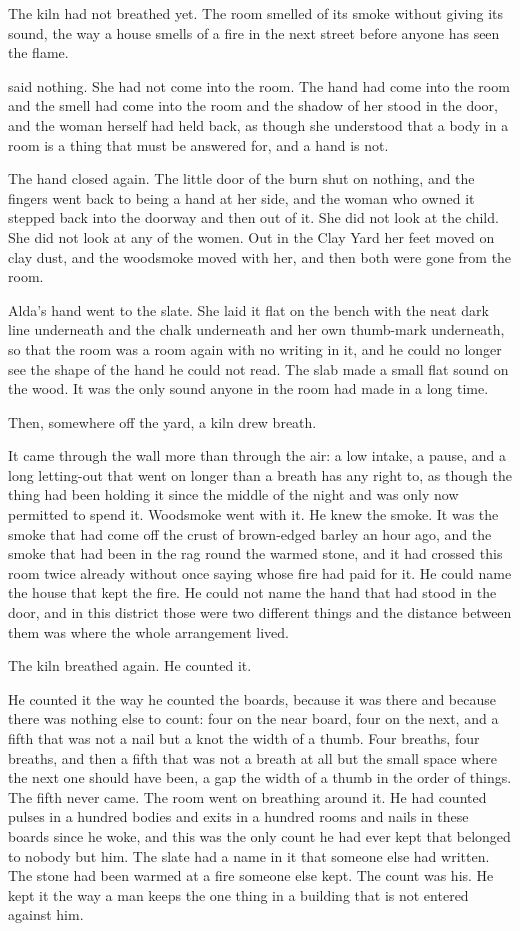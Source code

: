 The kiln had not breathed yet. The room smelled of its smoke without giving its sound, the way a house smells of a fire in the next street before anyone has seen the flame.

 said nothing. She had not come into the room. The hand had come into the room and the smell had come into the room and the shadow of her stood in the door, and the woman herself had held back, as though she understood that a body in a room is a thing that must be answered for, and a hand is not.

The hand closed again. The little door of the burn shut on nothing, and the fingers went back to being a hand at her side, and the woman who owned it stepped back into the doorway and then out of it. She did not look at the child. She did not look at any of the women. Out in the Clay Yard her feet moved on clay dust, and the woodsmoke moved with her, and then both were gone from the room.

Alda's hand went to the slate. She laid it flat on the bench with the neat dark line underneath and the chalk underneath and her own thumb-mark underneath, so that the room was a room again with no writing in it, and he could no longer see the shape of the hand he could not read. The slab made a small flat sound on the wood. It was the only sound anyone in the room had made in a long time.

Then, somewhere off the yard, a kiln drew breath.

It came through the wall more than through the air: a low intake, a pause, and a long letting-out that went on longer than a breath has any right to, as though the thing had been holding it since the middle of the night and was only now permitted to spend it. Woodsmoke went with it. He knew the smoke. It was the smoke that had come off the crust of brown-edged barley an hour ago, and the smoke that had been in the rag round the warmed stone, and it had crossed this room twice already without once saying whose fire had paid for it. He could name the house that kept the fire. He could not name the hand that had stood in the door, and in this district those were two different things and the distance between them was where the whole arrangement lived.

The kiln breathed again. He counted it.

He counted it the way he counted the boards, because it was there and because there was nothing else to count: four on the near board, four on the next, and a fifth that was not a nail but a knot the width of a thumb. Four breaths, four breaths, and then a fifth that was not a breath at all but the small space where the next one should have been, a gap the width of a thumb in the order of things. The fifth never came. The room went on breathing around it. He had counted pulses in a hundred bodies and exits in a hundred rooms and nails in these boards since he woke, and this was the only count he had ever kept that belonged to nobody but him. The slate had a name in it that someone else had written. The stone had been warmed at a fire someone else kept. The count was his. He kept it the way a man keeps the one thing in a building that is not entered against him.

